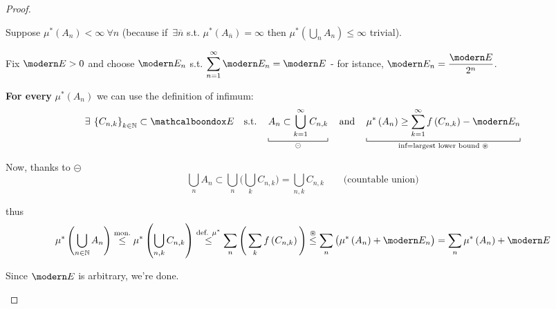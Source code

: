 \begin{proof}
\begin{itemize}
    Suppose $\mu^*\left( A_n \right)<\infty\ \forall n$ (because if $\,\exists \overline{n}$ s.t. $\mu^*\left( A_{\overline{n}} \right)=\infty$ then $\mu^*\left( \bigcup_{n}A_n \right)\leq\infty$ trivial).

    Fix $\Ec>0$ and choose $\Ec_n$ s.t. $\displaystyle\sum_{n=1}^\infty\Ec_n=\Ec$ - for istance, $\Ec_n=\dfrac{\Ec}{2^n}$.    

    \textbf{For every} $\mu^*\left( A_n \right)$ we can use the definition of infimum:
    \begin{equation*}
    \exists\left\{ C_{n,k} \right\}_{k\in\NN}\subset\bondox{E}\quad\text{s.t.}\quad \underbracket[0.5pt]{A_n\subset\bigcup_{k=1}^\infty C_{n,k}}_{\circleddash}\quad\text{and}\quad \underbracket[0.5pt]{\mu^*\left( A_n \right)\geq \sum_{k=1}^\infty f\left( C_{n,k} \right)-\Ec_n}_{\text{inf=largest lower bound }\circledast}
    \end{equation*}

    Now, thanks to $\circleddash$
    \begin{equation*}
    \bigcup_n A_n \subset \bigcup_n \Bigg( \bigcup_k C_{n,k} \Bigg)=\bigcup_{n,k} C_{n,k}\qquad\text{(countable union)}
    \end{equation*}

    thus
    \begin{equation*}
    \mu^*\left( \bigcup_{n\in\NN}A_n \right)\overset{\text{mon.}}{\leq} \mu^*\left( \bigcup_{n,k}C_{n,k} \right) \overset{\text{def. }\mu^*}{\leq} \sum_n\Bigg(\sum_k f\left( C_{n,k} \right) \Bigg) \overset{\circledast}{\leq} \sum_{n} \big( \mu^*\left( A_n \right)+\Ec_n \big) =  \sum_{n} \mu^*\left( A_n \right) + \Ec 
    \end{equation*}

    Since $\Ec$ is arbitrary, we're done.
\end{itemize}
\end{proof}


